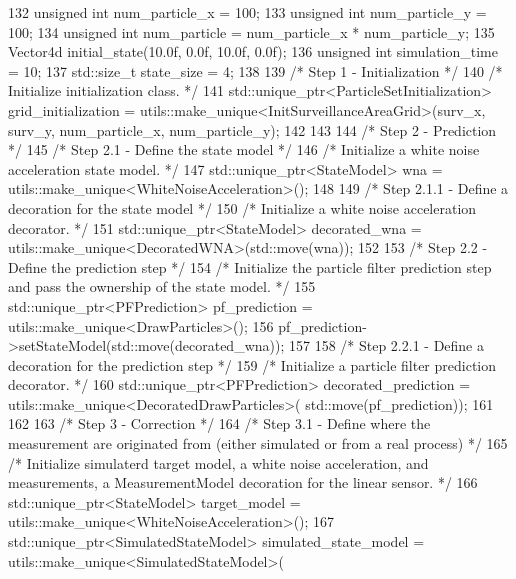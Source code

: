 \begin{DoxyCodeInclude}
132     \textcolor{keywordtype}{unsigned} \textcolor{keywordtype}{int} num\_particle\_x = 100;
133     \textcolor{keywordtype}{unsigned} \textcolor{keywordtype}{int} num\_particle\_y = 100;
134     \textcolor{keywordtype}{unsigned} \textcolor{keywordtype}{int} num\_particle = num\_particle\_x * num\_particle\_y;
135     Vector4d initial\_state(10.0f, 0.0f, 10.0f, 0.0f);
136     \textcolor{keywordtype}{unsigned} \textcolor{keywordtype}{int} simulation\_time = 10;
137     std::size\_t state\_size = 4;
138 
139     \textcolor{comment}{/* Step 1 - Initialization */}
140     \textcolor{comment}{/* Initialize initialization class. */}
141     std::unique\_ptr<ParticleSetInitialization> grid\_initialization = 
      utils::make\_unique<InitSurveillanceAreaGrid>(surv\_x, surv\_y, num\_particle\_x, num\_particle\_y);
142 
143 
144     \textcolor{comment}{/* Step 2 - Prediction */}
145     \textcolor{comment}{/* Step 2.1 - Define the state model */}
146     \textcolor{comment}{/* Initialize a white noise acceleration state model. */}
147     std::unique\_ptr<StateModel> wna = utils::make\_unique<WhiteNoiseAcceleration>();
148 
149     \textcolor{comment}{/* Step 2.1.1 - Define a decoration for the state model */}
150     \textcolor{comment}{/* Initialize a white noise acceleration decorator. */}
151     std::unique\_ptr<StateModel> decorated\_wna = utils::make\_unique<DecoratedWNA>(std::move(wna));
152 
153     \textcolor{comment}{/* Step 2.2 - Define the prediction step */}
154     \textcolor{comment}{/* Initialize the particle filter prediction step and pass the ownership of the state model. */}
155     std::unique\_ptr<PFPrediction> pf\_prediction = utils::make\_unique<DrawParticles>();
156     pf\_prediction->setStateModel(std::move(decorated\_wna));
157 
158     \textcolor{comment}{/* Step 2.2.1 - Define a decoration for the prediction step */}
159     \textcolor{comment}{/* Initialize a particle filter prediction decorator. */}
160     std::unique\_ptr<PFPrediction> decorated\_prediction = utils::make\_unique<DecoratedDrawParticles>(
      std::move(pf\_prediction));
161 
162 
163     \textcolor{comment}{/* Step 3 - Correction */}
164     \textcolor{comment}{/* Step 3.1 - Define where the measurement are originated from (either simulated or from a real
       process) */}
165     \textcolor{comment}{/* Initialize simulaterd target model, a white noise acceleration, and measurements, a MeasurementModel
       decoration for the linear sensor. */}
166     std::unique\_ptr<StateModel> target\_model = utils::make\_unique<WhiteNoiseAcceleration>();
167     std::unique\_ptr<SimulatedStateModel> simulated\_state\_model = utils::make\_unique<SimulatedStateModel>(

\end{DoxyCodeInclude}
